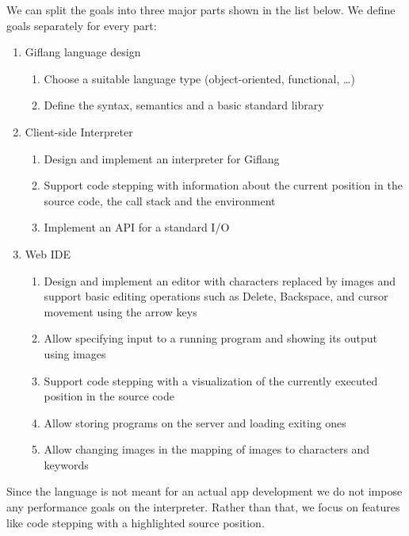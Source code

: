 We can split the goals into three major parts shown in the list below. We define goals separately for every part:
\begin{enumerate}
\item Giflang language design
   \begin{enumerate}[label=(\alph*)]
     \item Choose a suitable language type (object-oriented, functional, \ldots)
	 \item Define the syntax, semantics and a basic standard library
   \end{enumerate}
\item Client-side Interpreter
   \begin{enumerate}[label=(\alph*)]
	 \item Design and implement an interpreter for Giflang
	 \item Support code stepping with information about the current position in the source code, the call stack and the environment
	 \item Implement an API for a standard I/O
   \end{enumerate}
\item Web IDE
   \begin{enumerate}[label=(\alph*)]
     \item Design and implement an editor with characters replaced by images and support basic editing operations such as Delete,
     Backspace, and cursor movement using the arrow keys
	 \item Allow specifying input to a running program and showing its output using images
	 \item Support code stepping with a visualization of the currently executed position in the source code
	 \item Allow storing programs on the server and loading exiting ones
	 \item Allow changing images in the mapping of images to characters and keywords
	\end{enumerate}
\end{enumerate}

Since the language is not meant for an actual app development we do not impose any performance goals on the interpreter. Rather than that, we focus on features
like code stepping with a highlighted source position.
